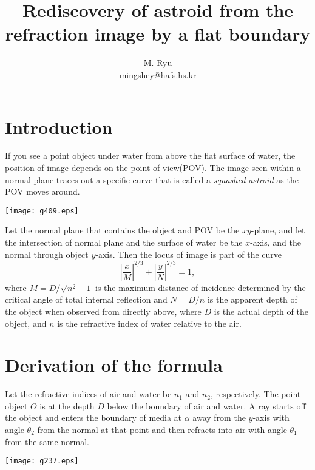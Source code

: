 \documentclass[twocolumn]{article}
\title{Rediscovery of astroid from the refraction image by a flat boundary}
\author{M. Ryu \\ {\href{mailto:mingshey@hafs.hs.kr}{mingshey@hafs.hs.kr}}}
\begin{document}
\maketitle
\section{Introduction}
If you see a point object under water from  above the flat surface of water, 
the position of image depends on the point of view(POV). The image seen
 within a normal plane traces out a specific curve that is called a  
 \emph{squashed astroid} as the POV moves around.

\texttt{[image: g409.eps]}

Let the normal plane that contains the object and  POV be the $xy$-plane,
 and let the intersection of  normal plane and the surface of water be the 
 $x$-axis, and the normal through  object $y$-axis. Then the locus of image 
 is part of the curve 
$$ \left| \dfrac{x}{M} \right| ^ {2/3} 
+ \left| \dfrac{y}{N} \right| ^ {2/3} = 1,$$
where $M = D/\sqrt{n^2 - 1}$ is the maximum distance of incidence
determined by the critical angle of total internal reflection and $N = D/n$ 
is the apparent depth of the object when observed from directly above, where
$D$ is the actual depth of the object, and $n$ is the refractive index of 
water relative to the air.

\section{Derivation of the formula}
Let the refractive indices  of air and water be $n_1$ and $n_2$, respectively. 
The point object $O$ is at the depth $D$ below the boundary of air and water. 
A ray starts off the object and enters the boundary of media at $\alpha$ away 
from the $y$-axis with angle $\theta_2$ from the normal at that point and then 
refracts into air with angle $\theta_1$ from the same normal.

\texttt{[image: g237.eps]}
\end{document}
